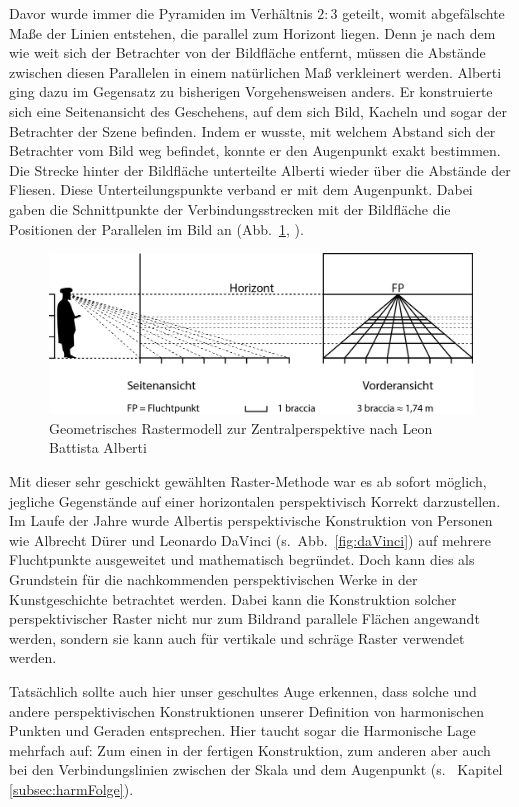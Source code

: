 \documentclass[12pt,a4paper]{article}
\begin{document}
Davor wurde immer die Pyramiden im Verhältnis $2 : 3$ geteilt, womit abgefälschte Maße der Linien entstehen, die parallel zum Horizont liegen. Denn je nach dem wie weit sich der Betrachter von der Bildfläche entfernt, müssen die Abstände zwischen diesen Parallelen in einem natürlichen Maß verkleinert werden. Alberti ging dazu im Gegensatz zu bisherigen Vorgehensweisen anders. Er konstruierte sich eine Seitenansicht des Geschehens, auf dem sich Bild, Kacheln und sogar der Betrachter der Szene befinden. Indem er wusste, mit welchem Abstand sich der Betrachter vom Bild weg befindet, konnte er den Augenpunkt exakt bestimmen. Die Strecke hinter der Bildfläche unterteilte Alberti wieder über die Abstände der Fliesen. Diese Unterteilungspunkte verband er mit dem Augenpunkt. Dabei gaben die Schnittpunkte der Verbindungsstrecken mit der Bildfläche die Positionen der Parallelen im Bild an (Abb.~\ref{fig:braccia}, \citep[vgl.][S.~31ff]{perspektive}).

\begin{figure}[htbp] 
\centering
\includegraphics[width=\textwidth]{Bilder/braccia.png}
\caption{Geometrisches Rastermodell zur Zentralperspektive nach Leon Battista Alberti}
\label{fig:braccia}
\end{figure}

Mit dieser sehr geschickt gewählten Raster-Methode war es ab sofort möglich, jegliche Gegenstände auf einer horizontalen perspektivisch Korrekt darzustellen. Im Laufe der Jahre wurde Albertis perspektivische Konstruktion von Personen wie Albrecht Dürer und Leonardo DaVinci (s.~Abb.~\ref{fig:daVinci}) auf mehrere Fluchtpunkte ausgeweitet und mathematisch begründet. Doch kann dies als Grundstein für die nachkommenden perspektivischen Werke in der Kunstgeschichte betrachtet werden. Dabei kann die Konstruktion solcher perspektivischer Raster nicht nur zum Bildrand parallele Flächen angewandt werden, sondern sie kann auch für vertikale und schräge Raster verwendet werden.

Tatsächlich sollte auch hier unser geschultes Auge erkennen, dass solche und andere perspektivischen Konstruktionen unserer Definition von harmonischen Punkten und Geraden entsprechen. Hier taucht sogar die Harmonische Lage mehrfach auf: Zum einen in der fertigen Konstruktion, zum anderen aber auch bei den Verbindungslinien zwischen der Skala und dem Augenpunkt (s.~ Kapitel \ref{subsec:harmFolge}).
\end{document}
